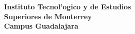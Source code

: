 \begin{center}
\textbf{Instituto Tecnol'ogico y de Estudios\\Superiores de Monterrey}\\
\LARGE
\textbf{Campus Guadalajara}\\
\vspace{11 pt}


\end{center}
